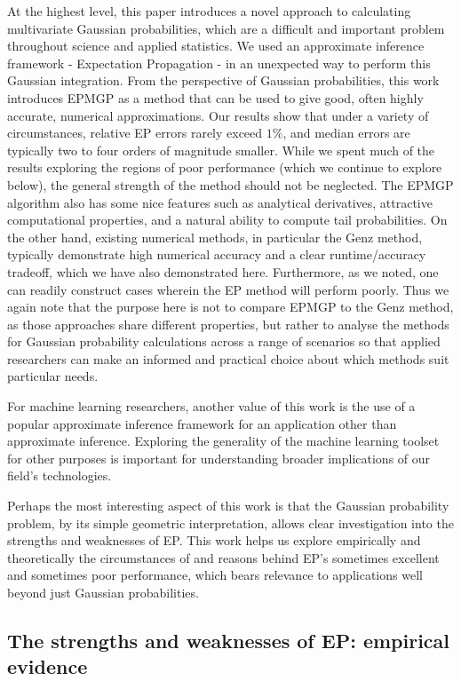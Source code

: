\documentclass[twoside,11pt]{article}
\begin{document}
At the highest level, this paper introduces a novel approach to calculating multivariate Gaussian probabilities, which are a difficult and important problem throughout science and applied statistics.   We used an approximate inference framework - Expectation Propagation - in an unexpected way to perform this Gaussian integration.  From the perspective of Gaussian probabilities, this work introduces EPMGP as a method that can be used to give good, often highly accurate, numerical approximations.  Our results show that under a variety of circumstances, relative EP errors rarely exceed $1\%$, and median errors are typically two to four orders of magnitude smaller.  While we spent much of the results exploring the regions of poor performance (which we continue to explore below), the general strength of the method should not be neglected.  The EPMGP algorithm also has some nice features such as analytical derivatives, attractive computational properties, and a natural ability to compute tail probabilities.  On the other hand, existing numerical methods, in particular the Genz method, typically demonstrate high numerical accuracy and a clear runtime/accuracy tradeoff, which we have also demonstrated here.   Furthermore, as we noted, one can readily construct cases wherein the EP method will perform poorly.  Thus we again note that the purpose here is not to compare EPMGP to the Genz method, as those approaches share different properties, but rather to analyse the methods for Gaussian probability calculations across a range of scenarios so that applied researchers can make an informed and practical choice about which methods suit particular needs.   

For machine learning researchers, another value of this work is the use of a popular approximate inference framework for an application other than approximate inference.  Exploring the generality of the machine learning toolset for other purposes is important for understanding broader implications of our field's technologies.

Perhaps the most interesting aspect of this work is that the Gaussian probability problem, by its simple geometric interpretation, allows clear investigation into the strengths and weaknesses of EP.  This work helps us explore empirically and theoretically the circumstances of and reasons behind EP's sometimes excellent and sometimes poor performance, which bears relevance to applications well beyond just Gaussian probabilities.  

\subsection{The strengths and weaknesses of EP: empirical evidence}
\end{document}
